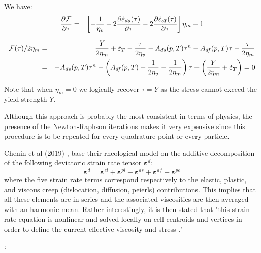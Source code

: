 \begin{itemize}
\begin{enumerate}
We have:
\begin{eqnarray}
\frac{\partial {\cal F}}{\partial \tau} &=&
\left[
- \frac{1}{\eta_v} 
-2 \frac{\partial  \dot\varepsilon_{ds}(\tau) }{\partial \tau} 
-2 \frac{\partial  \dot\varepsilon_{df}(\tau) }{\partial \tau} 
\right] \eta_m - 1
\end{eqnarray}

\begin{eqnarray}
{\cal F}(\tau) / 2\eta_m 
&=& 
\frac{Y}{2\eta_m}  + \dot\varepsilon_T 
- \frac{\tau}{2\eta_v}
- A_{ds}(p,T) \tau^n 
- A_{df}(p,T) \tau  
- \frac{\tau}{2\eta_m} \\
&=& 
- A_{ds}(p,T) \tau^n - \left(A_{df}(p,T) +  \frac{1}{2\eta_v} -\frac{1}{2\eta_m} \right) \tau
+ 
\left( \frac{Y}{2\eta_m}  + \dot\varepsilon_T \right) =0
\end{eqnarray}



\end{enumerate}

Note that when $\eta_m=0$ we logically recover $\tau=Y$ as the stress cannot exceed the yield strength $Y$.

Although this approach is probably the most consistent in terms of physics, the presence 
of the Newton-Raphson iterations makes it very expensive since this procedure is to be repeated 
for every quadrature point or every particle.

\end{itemize}




\begin{remark}
Chenin et al (2019) \cite{chmd19}, 
base their rheological model on the additive decomposition of the following
deviatoric strain rate tensor ${\bm \varepsilon}^d$:
\[
{\bm \varepsilon}^d =
{\bm \varepsilon}^{el}+
{\bm \varepsilon}^{pl}+
{\bm \varepsilon}^{ds}+
{\bm \varepsilon}^{df}+
{\bm \varepsilon}^{pe}
\]
where the five strain rate terms correspond respectively to the elastic, plastic, 
and viscous creep (dislocation, diffusion, peierls) contributions. 
This implies that all these elements are in series and the associated 
viscosities are then averaged with an harmonic mean. 
Rather interestingly, it is then stated that "this strain rate equation is nonlinear
and solved locally on cell centroids and vertices in order to define the current effective viscosity 
and stress \cite{poso08}."
\end{remark}


\Literature: \cite{hoor89,lopr90,homo90,scps01,lova01,anpa19,egat10}

